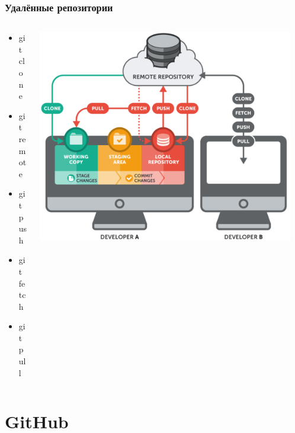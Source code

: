 \documentclass{../../slides-style}
\begin{document}
    \begin{frame}
        \frametitle{Удалённые репозитории}
        \begin{columns}
            \begin{column}{0.4\textwidth}
                \begin{itemize}
                    \item git clone
                    \item git remote
                    \item git push
                    \item git fetch
                    \item git pull
                \end{itemize}
            \end{column}
            \begin{column}{0.6\textwidth}
                \begin{center}
                    \includegraphics[width=0.95\textwidth]{remoteRepos.png}
                \end{center}
            \end{column}
        \end{columns}
    \end{frame}

    \section{GitHub}
\end{document}
